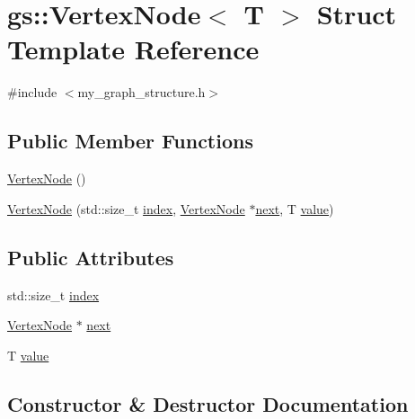 \hypertarget{structgs_1_1_vertex_node}{}\section{gs\+:\+:Vertex\+Node$<$ T $>$ Struct Template Reference}
\label{structgs_1_1_vertex_node}


{\ttfamily \#include $<$my\+\_\+graph\+\_\+structure.\+h$>$}

\subsection*{Public Member Functions}
\begin{DoxyCompactItemize}
\item 
\mbox{\hyperlink{structgs_1_1_vertex_node_af11908bdb28303e9d9ee6eccdfe50b67}{Vertex\+Node}} ()
\item 
\mbox{\hyperlink{structgs_1_1_vertex_node_a82bd37d0baf6474fb174a3bf5f9147ed}{Vertex\+Node}} (std\+::size\+\_\+t \mbox{\hyperlink{structgs_1_1_vertex_node_a8dd82fa9a0b37a0194368dcd7752b04a}{index}}, \mbox{\hyperlink{structgs_1_1_vertex_node}{Vertex\+Node}} $\ast$\mbox{\hyperlink{structgs_1_1_vertex_node_a7fc257ce53eb77e180531b39bb303250}{next}}, T \mbox{\hyperlink{structgs_1_1_vertex_node_a0bc246c7c0bfbea6354d90c704761fd3}{value}})
\end{DoxyCompactItemize}
\subsection*{Public Attributes}
\begin{DoxyCompactItemize}
\item 
std\+::size\+\_\+t \mbox{\hyperlink{structgs_1_1_vertex_node_a8dd82fa9a0b37a0194368dcd7752b04a}{index}}
\item 
\mbox{\hyperlink{structgs_1_1_vertex_node}{Vertex\+Node}} $\ast$ \mbox{\hyperlink{structgs_1_1_vertex_node_a7fc257ce53eb77e180531b39bb303250}{next}}
\item 
T \mbox{\hyperlink{structgs_1_1_vertex_node_a0bc246c7c0bfbea6354d90c704761fd3}{value}}
\end{DoxyCompactItemize}


\subsection{Constructor \& Destructor Documentation}
\mbox{\label{structgs_1_1_vertex_node_af11908bdb28303e9d9ee6eccdfe50b67}} 
